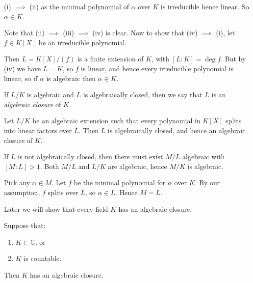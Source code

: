 \documentclass[12pt]{article}
\begin{document}
\begin{proofbox}
	(i) $\implies$ (ii) as the minimal polynomial of $\alpha$ over $K$ is irreducible hence linear. So $\alpha \in K$.

	Note that (ii) $\implies$ (iii) $\implies$ (iv) is clear. Now to show that (iv) $\implies$ (i), let $f \in K[X]$ be an irreducible polynomial.

	Then $L = K[X]/(f)$ is a finite extension of $K$, with $[L:K] = \deg f$. But by (iv) we have $L = K$, so $f$ is linear, and hence every irreducible polynomial is linear, so if $\alpha$ is algebraic then $\alpha \in K$.
\end{proofbox}

\begin{definition}
	If $L/K$ is algebraic and $L$ is algebraically closed, then we say that $L$ is an \emph{algebraic closure} of $K$.
\end{definition}

\begin{lemma}\label{lem:lin_split_alg_clo}
	Let $L/K$ be an algebraic extension such that every polynomial in $K[X]$ splits into linear factors over $L$. Then $L$ is algebraically closed, and hence an algebraic closure of $K$.
\end{lemma}

\begin{proofbox}
	If $L$ is not algebraically closed, then there must exist $M/L$ algebraic with $[M:L] > 1$. Both $M/L$ and $L/K$ are algebraic, hence $M/K$ is algebraic.

	Pick any $\alpha \in M$. Let $f$ be the minimal polynomial for $\alpha$ over $K$. By our assumption, $f$ splits over $L$, so $\alpha \in L$. Hence $M = L$.
\end{proofbox}

Later we will show that every field $K$ has an algebraic closure.

\begin{theorem}
	Suppose that:
	\begin{enumerate}[\normalfont(i)]
		\item $K \subset \mathbb{C}$, or
		\item $K$ is countable.
	\end{enumerate}
	Then $K$ has an algebraic closure.
\end{theorem}
\end{document}
